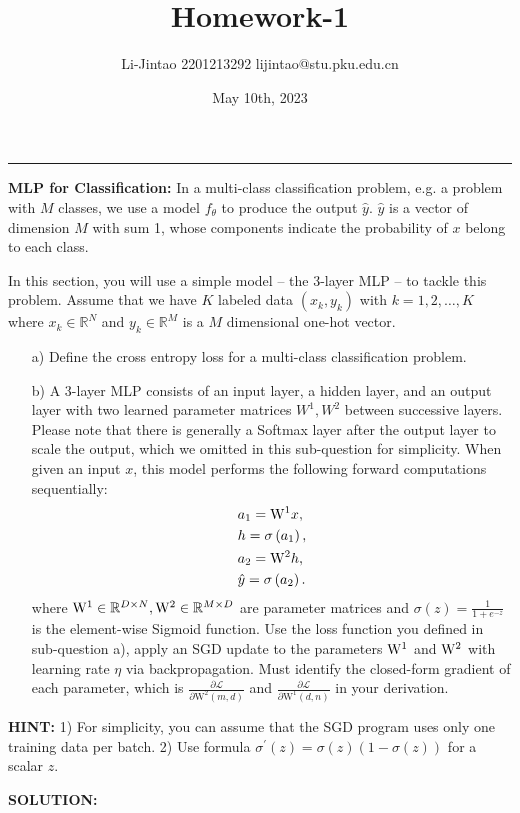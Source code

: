 \documentclass{homework}
\author{Li-Jintao 2201213292 lijintao@stu.pku.edu.cn}
\date{May 10th, 2023}
\title{\Large \textbf{Homework-1}}
\begin{document}
 \maketitle
\rule[0ex]{\textwidth}{1.5pt}
\begin{shaded}
    \question\textbf{MLP for Classification: }
In a multi-class classification problem, e.g. a problem with $M$ classes, we use a model $f_{\theta}$ to produce the output $\hat{y}$. $\hat{y}$ is a vector of dimension $M$ with sum 1, whose components indicate the probability of $x$ belong to each class.

In this section, you will use a simple model -- the 3-layer MLP -- to tackle this problem. Assume that we have $K$ labeled data $\left(x_{k}, y_{k}\right)$ with $k=1,2, \ldots, K$ where $x_{k} \in \mathbb{R}^{N}$ and $y_{k} \in \mathbb{R}^{M}$ is a $M$ dimensional one-hot vector. 
\begin{enumerate}
    \item[a)] Define the cross entropy loss for a multi-class classification problem.
    \item[b)] A 3-layer MLP consists of an input layer, a hidden layer, and an output layer with two learned parameter matrices $W^{1}, W^{2}$ between successive layers. Please note that there is generally a Softmax layer after the output layer to scale the output, which we omitted in this sub-question for simplicity. When given an input $x$, this model performs the following forward computations sequentially:
    \[\begin{aligned}
    & a_{1}={\rm W^{1}} x, \\
    & h=\sigma\left(a_{1}\right), \\
    & a_{2}=\mathrm{ W^{2}} h, \\
    & \hat{y}=\sigma\left(a_{2}\right) .
    \end{aligned}\]
    where ${\rm W^{1}} \in \mathbb{R}^{D \times N}, \mathrm{W^{2}} \in \mathbb{R}^{M \times D}$ are parameter matrices and $\sigma(z)=\frac{1}{1+e^{-z}}$ is the element-wise Sigmoid function. Use the loss function you defined in sub-question a), apply an SGD update to the parameters $\rm W^{1}$ and $\rm W^{2}$ with learning rate $\eta$ via backpropagation. Must identify the closed-form gradient of each parameter, which is $\frac{\partial \mathcal{L}}{\partial \mathrm{W^{2}}(m, d)}$ and $\frac{\partial \mathcal{L}}{\partial \mathrm{W^{1}}(d, n)}$ in your derivation.
\end{enumerate}
\textbf{HINT:}
    1) For simplicity, you can assume that the SGD program uses only one training data per batch. 
    2) Use formula $\sigma^{\prime}(z)=\sigma(z)(1-\sigma(z))$ for a scalar $z$. 
\end{shaded}
\textbf{SOLUTION:}
\end{document}

